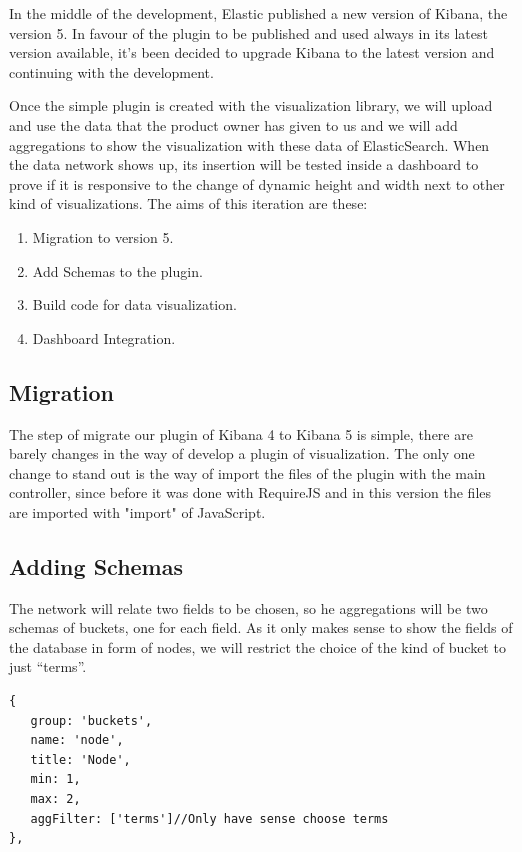 \documentclass[a4paper, 12pt]{book}
\begin{document}
In the middle of the development, Elastic published a new version of Kibana, the version 5. In favour of the plugin to be published and used always in its latest version available, it’s been decided to upgrade Kibana to the latest version and continuing with the development.

Once the simple plugin is created with the visualization library, we will upload and use the data that the product owner has given to us and we will add aggregations to show the visualization with these data of ElasticSearch. When the data network shows up, its insertion will be tested inside a dashboard to prove if it is responsive to the change of dynamic height and width next to other kind of visualizations. The aims of this iteration are these:

\begin{enumerate}
\item Migration to version 5.
\item Add Schemas to the plugin.
\item Build code for data visualization.
\item Dashboard Integration. 
\end{enumerate}

\subsection{Migration}

The step of migrate our plugin of Kibana 4 to Kibana 5 is simple, there are barely changes in the way of develop a plugin of visualization. The only one change to stand out is the way of import the files of the plugin with the main controller, since before it was done with RequireJS and in this version the files are imported with "import" of JavaScript.

\subsection{Adding Schemas}

The network will relate two fields to be chosen, so he aggregations will be two schemas of buckets, one for each field. As it only makes sense to show the fields of the database in form of nodes, we will restrict the choice of the kind of bucket to just “terms”. 

\begin{lstlisting}[frame=single]
{
   group: 'buckets',
   name: 'node',
   title: 'Node',
   min: 1,
   max: 2,
   aggFilter: ['terms']//Only have sense choose terms
},
\end{lstlisting}
\end{document}
